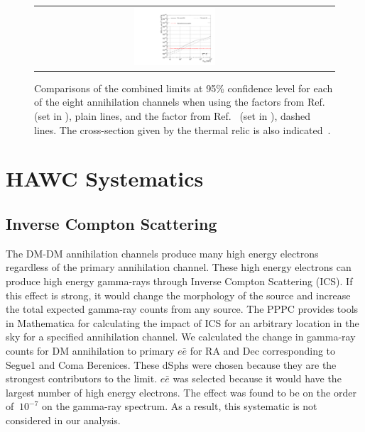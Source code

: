 \begin{figure}[t]
{\begin{tabular}{ccc}
    \includegraphics[width=0.3\textwidth]{figures/glory_duck/comparison/GD_limits_tautau.pdf} &
    \end{tabular}
    }
    \caption{Comparisons of the combined limits at 95\% confidence level for each of the eight annihilation channels when using the \J factors from Ref.~\cite{Geringer-Sameth:2014yza} (\GS set in ), plain lines, and the \J factor from Ref.~\cite{Bonnivard:2014kza, Bonnivard:2015xpq} (\B set in ), dashed lines. The cross-section given by the thermal relic is also indicated~\cite{Bertone_2005}.}
\label{fig:limits-comparison}
\end{figure}

\section{HAWC Systematics} \label{sec:hawc_systematic}

\subsection{Inverse Compton Scattering} \label{sec:gd_ics}
The DM-DM annihilation channels produce many high energy electrons regardless of the primary annihilation channel.
These high energy electrons can produce high energy gamma-rays through Inverse Compton Scattering (ICS).
If this effect is strong, it would change the morphology of the source and increase the total expected gamma-ray counts from any source.
The PPPC \cite{Cirelli_2011} provides tools in Mathematica for calculating the impact of ICS for an arbitrary location in the sky for a specified annihilation channel.
We calculated the change in gamma-ray counts for DM annihilation to primary $e\bar{e}$ for RA and Dec corresponding to Segue1 and Coma Berenices.
These dSphs were chosen because they are the strongest contributors to the limit.
$e\bar{e}$ was selected because it would have the largest number of high energy electrons.
The effect was found to be on the order of $~10^{-7}$ on the gamma-ray spectrum.
As a result, this systematic is not considered in our analysis.

